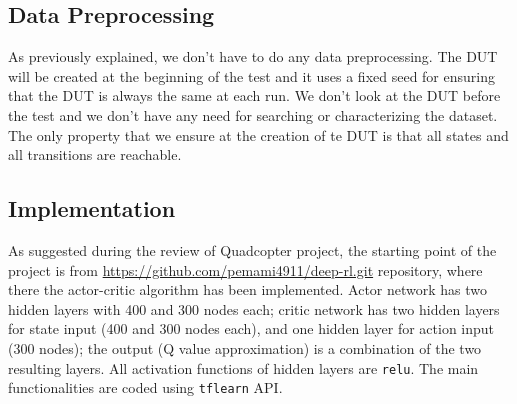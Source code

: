 \documentclass{article}
\begin{document}
\subsection{Data Preprocessing}
% 
% 
% 
As previously explained, we don't have to do any data preprocessing. The DUT will be created at the beginning of the test and it uses a fixed seed for ensuring that the DUT is always the same at each run. We don't look at the DUT before the test and we don't have any need for searching or characterizing the dataset. The only property that we ensure at the creation of te DUT is that all states and all transitions are reachable.


\subsection{Implementation}
% 
% 
% 

As suggested during the review of Quadcopter project, the starting point of the project is from \href{this}{https://github.com/pemami4911/deep-rl.git} repository, where there the actor-critic algorithm has been implemented. Actor network has two hidden layers with 400 and 300 nodes each; critic network has two hidden layers for state input (400 and 300 nodes each), and one hidden layer for action input (300 nodes); the output (Q value approximation) is a combination of the two resulting layers. All activation functions of hidden layers are \texttt{relu}. The main functionalities are coded using \texttt{tflearn} API.
\end{document}
